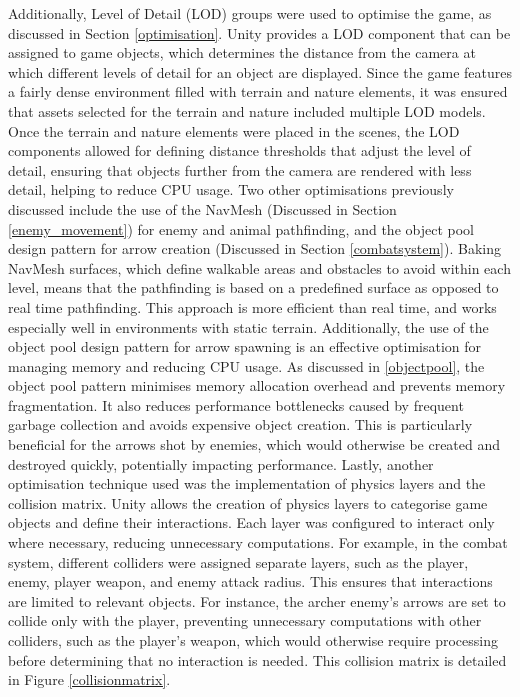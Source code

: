 \documentclass[10pt]{final_report}
\begin{document}
Additionally, Level of Detail (LOD) groups were used to optimise the game, as discussed in Section \ref{optimisation}. Unity provides a LOD component that can be assigned to game objects, which determines the distance from the camera at which different levels of detail for an object are displayed. Since the game features a fairly dense environment filled with terrain and nature elements, it was ensured that assets selected for the terrain and nature included multiple LOD models. Once the terrain and nature elements were placed in the scenes, the LOD components allowed for defining distance thresholds that adjust the level of detail, ensuring that objects further from the camera are rendered with less detail, helping to reduce CPU usage.
\newline
Two other optimisations previously discussed include the use of the NavMesh (Discussed in Section \ref{enemy_movement}) for enemy and animal pathfinding, and the object pool design pattern for arrow creation (Discussed in Section \ref{combatsystem}). Baking NavMesh surfaces, which define walkable areas and obstacles to avoid within each level, means that the pathfinding is based on a predefined surface as opposed to real time pathfinding. This approach is more efficient than real time, and works especially well in environments with static terrain. Additionally, the use of the object pool design pattern for arrow spawning is an effective optimisation for managing memory and reducing CPU usage. As discussed in \ref{objectpool}, the object pool pattern minimises memory allocation overhead and prevents memory fragmentation. It also reduces performance bottlenecks caused by frequent garbage collection and avoids expensive object creation. This is particularly beneficial for the arrows shot by enemies, which would otherwise be created and destroyed quickly, potentially impacting performance.
\newline 
Lastly, another optimisation technique used was the implementation of physics layers and the collision matrix. Unity allows the creation of physics layers to categorise game objects and define their interactions. Each layer was configured to interact only where necessary, reducing unnecessary computations. For example, in the combat system, different colliders were assigned separate layers, such as the player, enemy, player weapon, and enemy attack radius. This ensures that interactions are limited to relevant objects. For instance, the archer enemy’s arrows are set to collide only with the player, preventing unnecessary computations with other colliders, such as the player’s weapon, which would otherwise require processing before determining that no interaction is needed. This collision matrix is detailed in Figure \ref{collisionmatrix}.
\end{document}
